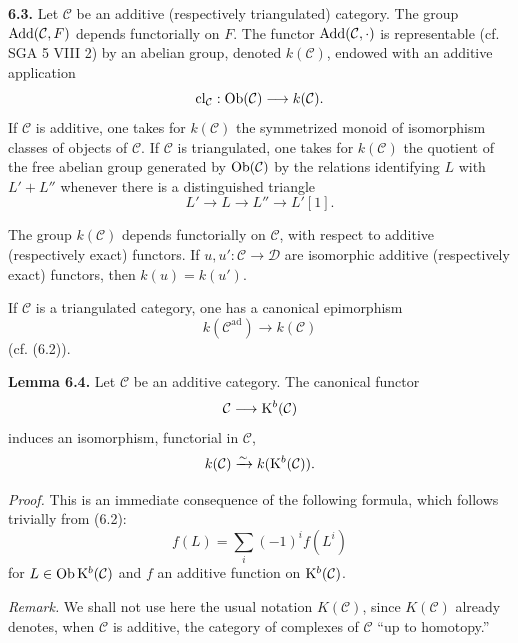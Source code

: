 \documentclass[11pt]{article}
\newcommand{\cl}{\operatorname{cl}}
\begin{document}
\textbf{6.3.} Let \(\mathcal C\) be an additive (respectively triangulated) category. The group \(\operatorname{Add}(\mathcal C,F)\) depends functorially on \(F\). The functor \(\operatorname{Add}(\mathcal C,\cdot)\) is representable (cf. SGA 5 VIII 2) by an abelian group, denoted \(k(\mathcal C)\), endowed with an additive application
\[
  \cl_{\mathcal C}:\Ob(\mathcal C)\longrightarrow k(\mathcal C).
\]
If \(\mathcal C\) is additive, one takes for \(k(\mathcal C)\) the symmetrized monoid of isomorphism classes of objects of \(\mathcal C\). If \(\mathcal C\) is triangulated, one takes for \(k(\mathcal C)\) the quotient of the free abelian group generated by \(\operatorname{Ob}(\mathcal C)\) by the relations identifying \(L\) with \(L'+L''\) whenever there is a distinguished triangle
\[
  L'\longrightarrow L\longrightarrow L''\longrightarrow L'[1].
\]

The group \(k(\mathcal C)\) depends functorially on \(\mathcal C\), with respect to additive (respectively exact) functors. If \(u,u':\mathcal C\to\mathcal D\) are isomorphic additive (respectively exact) functors, then \(k(u)=k(u')\).

If \(\mathcal C\) is a triangulated category, one has a canonical epimorphism
\[
  k(\mathcal C^{\mathrm{ad}})\longrightarrow k(\mathcal C)
\]
(cf. (6.2)).

\textbf{Lemma 6.4.} Let \(\mathcal C\) be an additive category. The canonical functor
\[
  \mathcal C\longrightarrow \mathrm K^b(\mathcal C)
\]
induces an isomorphism, functorial in \(\mathcal C\),
\[
  k(\mathcal C)\xrightarrow{\sim} k(\mathrm K^b(\mathcal C)).
\]

\emph{Proof.} This is an immediate consequence of the following formula, which follows trivially from (6.2):
\begin{equation}\tag{6.4.1}
  f(L)=\sum_i (-1)^i f(L^i)
\end{equation}
for \(L\in\operatorname{Ob}\mathrm K^b(\mathcal C)\) and \(f\) an additive function on \(\mathrm K^b(\mathcal C)\).

\emph{Remark.} We shall not use here the usual notation \(K(\mathcal C)\), since \(K(\mathcal C)\) already denotes, when \(\mathcal C\) is additive, the category of complexes of \(\mathcal C\) ``up to homotopy.''
\end{document}

